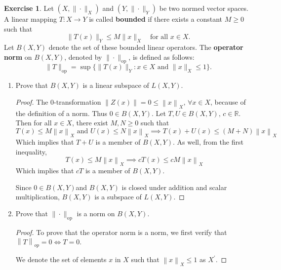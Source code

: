 \documentclass{article}
\theoremstyle{plain} %
\numberwithin{thm}{section} %
\theoremstyle{definition}
\newtheorem{exercise}[thm]{Exercise} %
\begin{document}
    \begin{exercise}
        Let $(X,\|\cdot\|_X)$ and $(Y,\|\cdot\|_Y)$ be two normed vector spaces. A linear mapping $T:X\rightarrow Y$ is called \textbf{bounded} if there exists a constant $M\geq 0$ such that
        \[ \|T(x)\|_Y \leq M \|x\|_X \quad \text{for all $x\in X$.}  \]
        Let $B(X,Y)$ denote the set of these bounded linear operators. The \textbf{operator norm} on $B(X,Y)$, denoted by $\|\cdot\|_{\mathrm{op}}$, is defined as follows:
            \[ \|T\|_{\mathrm{op}} = \sup\{ \|T(x)\|_Y : x\in X \text{ and } \|x\|_X\leq 1 \}. \]
        \begin{enumerate}[label=(\alph*)]
            \item Prove that $B(X,Y)$ is a linear subspace of $L(X,Y)$.
            
            \begin{proof}
                The 0-transformation \(\left\lVert Z(x) \right\rVert  = 0 \leq \left\lVert x \right\rVert _X \text{, } \forall x \in X\), because of the definition of a norm. Thus \(0 \in B(X,Y)\).
                Let \(T, U \in B(X,Y) \text{, } c \in \mathbb{R}\). Then for all \(x \in X\), there exist \(M, N \geq 0\) such that
                \[
                    T(x) \leq M \left\lVert x \right\rVert _X \text{ and } U(x) \leq N \left\lVert x \right\rVert _X \implies T(x) + U(x) \leq (M+N) \left\lVert x \right\rVert _X
                \] 
                Which implies that \(T+U\) is a member of \(B(X,Y)\). As well, from the first inequality,
                \[
                    T(x) \leq M \left\lVert x \right\rVert _X \implies cT(x) \leq  cM \left\lVert x \right\rVert _X
                \]
                Which implies that \(cT\) is a member of \(B(X,Y)\).

                Since \(0 \in B(X,Y)\)and \(B(X,Y)\) is closed under addition and scalar multiplication, \(B(X,Y)\) is a subspace of \(L(X,Y)\).

            \end{proof}
            \item Prove that $\|\cdot\|_{\mathrm{op}}$ is a norm on $B(X,Y)$.
        
            \begin{proof}
                To prove that the operator norm is a norm, we first verify that \(\left\lVert T \right\rVert _{op} = 0 \iff T = 0\).

                We denote the set of elements \(x\) in \(X\) such that \(\left\lVert x \right\rVert _X \leq 1\) as \(X^\prime\).


\end{proof}
\end{enumerate}
\end{exercise}
\end{document}
